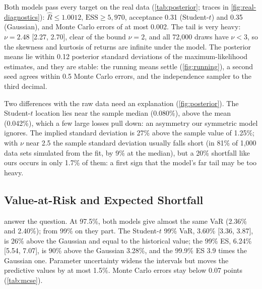 \documentclass[12pt]{article}
\newcommand{\VaR}{\mathrm{VaR}}
\newcommand{\ES}{\mathrm{ES}}
\begin{document}
Both models pass every target on the real data (\cref{tab:posterior}; traces in \cref{fig:real-diagnostics}): $\hat R \le 1.0012$, $\mathrm{ESS} \ge 5{,}970$, acceptance 0.31 (Student-$t$) and 0.35 (Gaussian), and Monte Carlo errors of at most 0.002. The tail is very heavy: $\nu = 2.48$ [2.27, 2.70], clear of the bound $\nu = 2$, and all 72,000 draws have $\nu < 3$, so the skewness and kurtosis of returns are infinite under the model. The posterior means lie within 0.12 posterior standard deviations of the maximum-likelihood estimates, and they are stable: the running means settle (\cref{fig:running}), a second seed agrees within 0.5 Monte Carlo errors, and the independence sampler to the third decimal.


Two differences with the raw data need an explanation (\cref{fig:posterior}). The Student-$t$ location lies near the sample median (0.080\%), above the mean (0.042\%), which a few large losses pull down: an asymmetry our symmetric model ignores. The implied standard deviation is 27\% above the sample value of 1.25\%; with $\nu$ near 2.5 the sample standard deviation usually falls short (in 81\% of 1,000 data sets simulated from the fit, by 9\% at the median), but a 20\% shortfall like ours occurs in only 1.7\% of them: a first sign that the model's far tail may be too heavy.

\subsection{Value-at-Risk and Expected Shortfall}

 answer the question. At 97.5\%, both models give almost the same VaR (2.36\% and 2.40\%); from 99\% on they part. The Student-$t$ 99\% VaR, 3.60\% [3.36, 3.87], is 26\% above the Gaussian and equal to the historical value; the 99\% ES, 6.24\% [5.54, 7.07], is 90\% above the Gaussian 3.28\%, and the 99.9\% ES 3.9 times the Gaussian one. Parameter uncertainty widens the intervals but moves the predictive values by at most 1.5\%. Monte Carlo errors stay below 0.07 points (\cref{tab:mcse}).

\begin{table}[t]
  \centering
  \caption{One-day VaR and ES (loss in \%). Gaussian, Student-$t$: predictive values; 95\% interval: posterior of $\VaR_\alpha(\theta)$ or $\ES_\alpha(\theta)$; historical: empirical values. Tail effect: Student-$t$ against Gaussian; uncertainty: predictive against plug-in.}
  \label{tab:risk}
  \footnotesize
  \setlength{\tabcolsep}{3.5pt}
  
\end{table}
\end{document}
